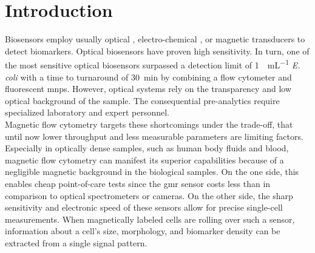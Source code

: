 \chapter{Introduction}
Biosensors employ usually optical \cite{lit:bio:BioconjugateTechniques}, electro-chemical \cite{lit:fluidic:BindingPhysicsSurfaces}, or magnetic \cite{lit:thes:reisbeck, lit:bio:MRCyte2016, lit:bio:NanoCytometer} transducers to detect biomarkers.  Optical  biosensors  have  proven high sensitivity.\cite{lit:Shapiro}  In turn, one of the  most  sensitive  optical  biosensors surpassed a detection limit of \SI{1}{\cfu\per\milli\liter} \textit{E. coli} with a time to turnaround of \SI{30}{\minute} by combining a flow  cytometer and fluorescent \glspl{mnp}.\cite{lit:flowCytometer} However, optical systems rely on the transparency and low optical background of the sample. The consequential pre-analytics require specialized laboratory and expert personnel.\\
Magnetic flow cytometry targets these shortcomings under the trade-off, that until now lower throughput and less measurable parameters are limiting factors.\cite{lit:thes:reisbeck} Especially in optically dense samples, such as human body fluids and blood, magnetic flow cytometry can manifest its superior capabilities because of a negligible magnetic background in the biological samples.\cite{lit:bio:biochip:cd64} On the one side, this enables cheap point-of-care tests since the \gls{gmr} sensor costs less than  in comparison to optical spectrometers or cameras.\cite{lit:fluidic:HighFlowGMR,lit:bio:aflatoxinMNP,lit:bio:POC_CD64} On the other side, the sharp sensitivity and electronic speed of these sensors allow for precise single-cell measurements.\cite{lit:bio:MRCyte2016,lit:fluidic:GMR_Quantification, lit:paperHelou} When magnetically labeled cells are rolling over such a sensor, information about a cell's size, morphology, and biomarker density can be extracted from a single signal pattern.\cite{lit:thes:michaelBauer} 

